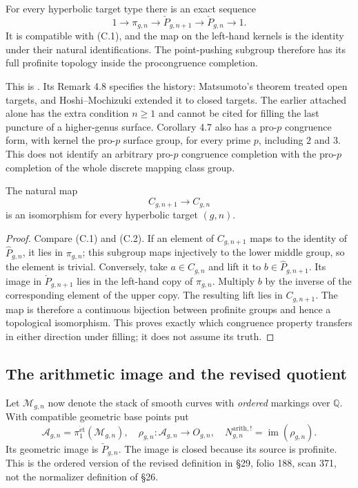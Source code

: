For every hyperbolic target type there is an exact sequence
\[
 1\longrightarrow\pi_{g,n}
 \longrightarrow\check P_{g,n+1}
 \longrightarrow\check P_{g,n}\longrightarrow1.
 \tag{C.2}
\]
It is compatible with (C.1), and the map on the left-hand kernels
is the identity under their natural identifications.  The
point-pushing subgroup therefore has its full profinite topology
inside the procongruence completion.

This is \citet[Corollary 4.7, with $\mathscr C=\mathscr F$,
and Proposition 2.4(ii)]{Boggi2020BC}.  Its Remark 4.8 specifies
the history: Matsumoto's theorem treated open targets, and
Hoshi--Mochizuki extended it to closed targets.  The earlier
attached \citet[Theorem 2.5]{Boggi2009BC} alone has the extra
condition $n\geq1$ and cannot be cited for filling the last
puncture of a higher-genus surface.  Corollary 4.7 also has a
pro-$p$ congruence form, with kernel the pro-$p$ surface group,
for every prime $p$, including $2$ and $3$.  This does not identify
an arbitrary pro-$p$ congruence completion with the pro-$p$
completion of the whole discrete mapping class group.

The natural map
\[
 C_{g,n+1}\longrightarrow C_{g,n}
\]
is an isomorphism for every hyperbolic target $(g,n)$.

\begin{proof}
Compare (C.1) and (C.2).  If an element of $C_{g,n+1}$ maps to
the identity of $\widehat P_{g,n}$, it lies in $\pi_{g,n}$; this
subgroup maps injectively to the lower middle group, so the
element is trivial.  Conversely, take $a\in C_{g,n}$ and lift it
to $b\in\widehat P_{g,n+1}$.  Its image in
$\check P_{g,n+1}$ lies in the left-hand copy of $\pi_{g,n}$.
Multiply $b$ by the inverse of the corresponding element of the
upper copy.  The resulting lift lies in $C_{g,n+1}$.  The map is
therefore a continuous bijection between profinite groups and
hence a topological isomorphism.  This proves exactly which
congruence property transfers in either direction under filling;
it does not assume its truth.
\end{proof}

\subsection{The arithmetic image and the revised quotient}

Let $\mathcal M_{g,n}$ now denote the stack of smooth curves with
\emph{ordered} markings over $\mathbb Q$.  With compatible
geometric base points put
\[
 \mathcal A_{g,n}=\pi_1^{\mathrm{\acute et}}(\mathcal M_{g,n}),
 \quad
 \rho_{g,n}:\mathcal A_{g,n}\to O_{g,n},
 \quad
 N^{\mathrm{arith},!}_{g,n}=\operatorname{im}(\rho_{g,n}).
\]
Its geometric image is $\check P_{g,n}$.  The image is closed
because its source is profinite.  This is the ordered version of
the revised definition in \S29, folio 188, scan 371, not the
normalizer definition of \S26.

